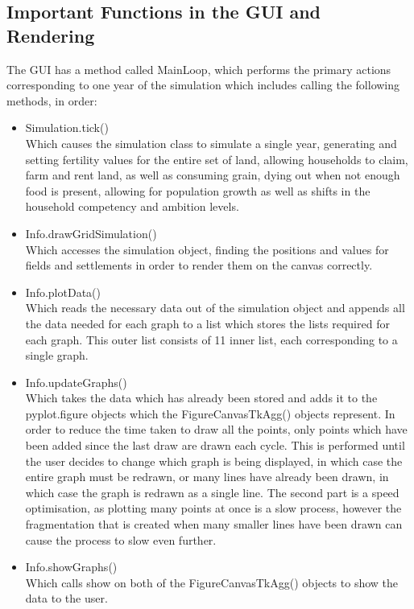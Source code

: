 \documentclass[12pt]{article}
\begin{document}
		\subsection{Important Functions in the GUI and Rendering}
			The GUI has a method called MainLoop, which performs the primary actions corresponding to one year of the simulation which includes calling the following methods, in order:
			\begin{itemize}
				\item Simulation.tick()\\
				Which causes the simulation class to simulate a single year, generating and setting fertility values for the entire set of land, allowing households to claim, farm and rent land, as well as consuming grain, dying out when not enough food is present, allowing for population growth as well as shifts in the household competency and ambition levels.
				\item Info.drawGridSimulation()\\
				Which accesses the simulation object, finding the positions and values for fields and settlements in order to render them on the canvas correctly.
				\item Info.plotData()\\
				Which reads the necessary data out of the simulation object and appends all the data needed for each graph to a list which stores the lists required for each graph. This outer list consists of 11 inner list, each corresponding to a single graph.
				\item Info.updateGraphs()\\
				Which takes the data which has already been stored and adds it to the pyplot.figure objects which the FigureCanvasTkAgg() objects represent. In order to reduce the time taken to draw all the points, only points which have been added since the last draw are drawn each cycle. This is performed until the user decides to change which graph is being displayed, in which case the entire graph must be redrawn, or many lines have already been drawn, in which case the graph is redrawn as a single line. The second part is a speed optimisation, as plotting many points at once is a slow process, however the fragmentation that is created when many smaller lines have been drawn can cause the process to slow even further.
				\item Info.showGraphs()\\
				Which calls show on both of the FigureCanvasTkAgg() objects to show the data to the user.
			\end{itemize}
			
\end{document}
